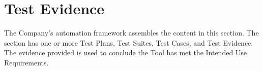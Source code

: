 \clearpage
\section{Test Evidence}
The Company's automation framework assembles the content in this section.  The
section has one or more Test Plans, Test Suites, Test Cases, and Test Evidence.
The evidence provided is used to conclude the Tool has met the Intended Use
Requirements.
